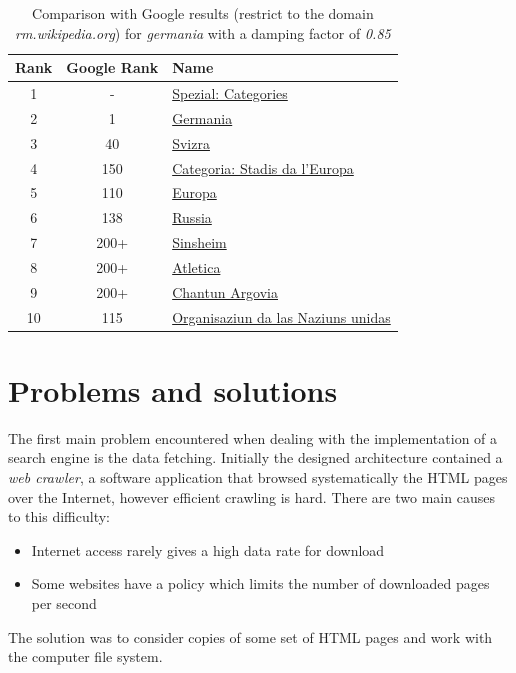 \documentclass[pdftex,12pt,a4paper]{article}
\begin{document}
\begin{table}[H]
\centering
\begin{tabular}{ | c | c | l | }
\hline
Rank & Google Rank & Name \\ \hline
1 & - & \href{http://rm.wikipedia.org/wiki/Spezial:Categories}{Spezial: Categories} \\ \hline
2 & 1 & \href{http://rm.wikipedia.org/wiki/Germania}{Germania} \\ \hline
3 & 40 & \href{http://rm.wikipedia.org/wiki/Svizra}{Svizra} \\ \hline
4 & 150 & \href{http://rm.wikipedia.org/wiki/Categoria:Stadis_da_l'Europa}{Categoria: Stadis da l'Europa} \\ \hline
5 & 110 & \href{http://rm.wikipedia.org/wiki/Europa}{Europa} \\ \hline
6 & 138 & \href{http://rm.wikipedia.org/wiki/Russia}{Russia} \\ \hline
7 & 200+ & \href{http://rm.wikipedia.org/wiki/Sinsheim}{Sinsheim} \\ \hline
8 & 200+& \href{http://rm.wikipedia.org/wiki/Atletica}{Atletica} \\ \hline
9 & 200+ & \href{http://rm.wikipedia.org/wiki/Chantun_Argovia}{Chantun Argovia} \\ \hline
10 & 115 & \href{http://rm.wikipedia.org/wiki/Organisaziun_da_las_Naziuns_unidas}{Organisaziun da las Naziuns unidas} \\ \hline
\end{tabular}
\caption{Comparison with Google results (restrict to the domain \emph{rm.wikipedia.org}) for \emph{germania} with a damping factor of \emph{0.85}}
\label{table_comparison}
\end{table}


\section{Problems and solutions}

The first main problem encountered when dealing with the implementation of a search engine is the data fetching. Initially the designed architecture contained a \emph{web crawler}, a software application that browsed systematically the HTML pages over the Internet, however efficient crawling is hard.
There are two main causes to this difficulty:
\begin{itemize}
\item Internet access rarely gives a high data rate for download
\item Some websites have a policy which limits the number of downloaded pages per second
\end{itemize}
The solution was to consider copies of some set of HTML pages and work with the computer file system.
\end{document}
